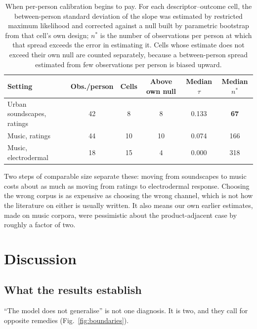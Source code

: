 \begin{table}[htbp]
\centering
\small
\caption{When per-person calibration begins to pay. For each descriptor--outcome
cell, the between-person standard deviation of the slope was estimated by
restricted maximum likelihood and corrected against a null built by parametric
bootstrap from that cell's own design; $n^{*}$ is the number of observations per
person at which that spread exceeds the error in estimating it. Cells whose
estimate does not exceed their own null are counted separately, because a
between-person spread estimated from few observations per person is biased upward.}
\label{tab:individual}
\begin{tabular}{lccccc}
\toprule
Setting & Obs./person & Cells & Above own null & Median $\tau$ & Median $n^{*}$ \\
\midrule
Urban soundscapes, ratings & 42 & 8 & 8 & 0.133 & \textbf{67} \\
Music, ratings & 44 & 10 & 10 & 0.074 & 166 \\
Music, electrodermal & 18 & 15 & 4 & 0.000 & 318 \\
\bottomrule
\end{tabular}
\end{table}

Two steps of comparable size separate these: moving from soundscapes to music costs
about as much as moving from ratings to electrodermal response. Choosing the wrong
corpus is as expensive as choosing the wrong channel, which is not how the
literature on either is usually written. It also means our own earlier estimates,
made on music corpora, were pessimistic about the product-adjacent case by roughly
a factor of two.

\section*{Discussion}

\subsection*{What the results establish}

``The model does not generalise'' is not one diagnosis. It is two, and they call
for opposite remedies (Fig.~\ref{fig:boundaries}).

